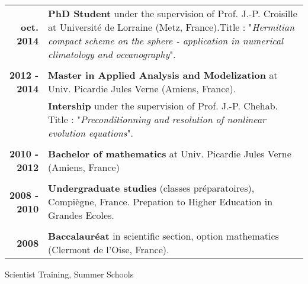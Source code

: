 \documentclass[10pt,a4paper]{report}
\begin{document}
\begin{center}
\begin{tabular}{r p{12cm}}
\textbf{oct. 2014} & \textbf{PhD Student} under the supervision of Prof. J.-P. Croisille at Université de Lorraine (Metz, France).\newline Title : "\textit{Hermitian compact scheme on the sphere - application in numerical climatology and oceanography}".\\

& \\

\textbf{2012 - 2014} & \textbf{Master in Applied Analysis and Modelization} at Univ. Picardie Jules Verne (Amiens, France). \\

& \textbf{Intership} under the supervision of Prof. J.-P. Chehab. \newline 
Title : "\textit{Preconditionning and resolution of nonlinear evolution equations}". \\

& \\

\textbf{2010 - 2012} & \textbf{Bachelor of mathematics} at Univ. Picardie Jules Verne (Amiens, France) \\

& \\

\textbf{2008 - 2010} & \textbf{Undergraduate studies} (classes préparatoires), Compiègne, France.\newline
Prepation to Higher Education in Grandes Ecoles. \\

& \\

\textbf{2008} & \textbf{Baccalauréat} in scientific section, option mathematics (Clermont de l'Oise, France).\\
\end{tabular}
\end{center}

\vspace{1cm}
\noindent
{\selectfont
\begin{Large}
Scientist Training, Summer Schools
\end{Large}
\hrulefill
}

\vspace{0.6cm}
\end{document}
